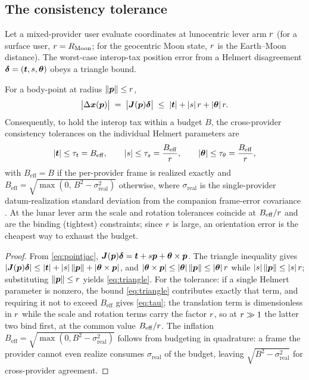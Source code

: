 \subsection{The consistency tolerance}

Let a mixed-provider user evaluate coordinates at lunocentric lever arm $r$
(for a surface user, $r=R_{\mathrm{Moon}}$; for the geocentric Moon state,
$r$ is the Earth--Moon distance). The worst-case interop-tax position error from
a Helmert disagreement $\bm{\delta}=(\bm{t},s,\bm{\theta})$ obeys a triangle bound.

\begin{theorem}
\label{thm:tolerance}
For a body-point at radius $\|\bm{p}\|\le r$,
\begin{equation}
  \bigl|\Delta\bm{x}(\bm{p})\bigr|
  \;=\; \bigl|\bm{J}(\bm{p})\bm{\delta}\bigr|
  \;\le\; |\bm{t}| + |s|\,r + |\bm{\theta}|\,r .
  \label{eq:triangle}
\end{equation}
Consequently, to hold the interop tax within a budget $B$, the cross-provider
consistency tolerances on the individual Helmert parameters are
\begin{equation}
  |\bm{t}| \le \tau_t = B_{\mathrm{eff}},
  \qquad
  |s| \le \tau_s = \frac{B_{\mathrm{eff}}}{r},
  \qquad
  |\bm{\theta}| \le \tau_\theta = \frac{B_{\mathrm{eff}}}{r},
  \label{eq:tau}
\end{equation}
with $B_{\mathrm{eff}}=B$ if the per-provider frame is realized exactly and
$B_{\mathrm{eff}}=\sqrt{\max(0,\,B^2-\sigma_{\mathrm{real}}^2)}$ otherwise, where
$\sigma_{\mathrm{real}}$ is the single-provider datum-realization standard deviation
from the companion frame-error covariance \citep{baweja2026datum}. At the lunar lever
arm the scale and rotation tolerances coincide at $B_{\mathrm{eff}}/r$ and are
the binding (tightest) constraints; since $r$ is large, an orientation error is
the cheapest way to exhaust the budget.
\end{theorem}

\begin{proof}
From \eqref{eq:pointjac},
$\bm{J}(\bm{p})\bm{\delta}=\bm{t}+s\bm{p}+\bm{\theta}\times\bm{p}$. The triangle inequality gives
$|\bm{J}(\bm{p})\bm{\delta}|\le|\bm{t}|+|s|\,\|\bm{p}\|+|\bm{\theta}\times\bm{p}|$, and
$|\bm{\theta}\times\bm{p}|\le|\bm{\theta}|\,\|\bm{p}\|\le|\bm{\theta}|\,r$ while
$|s|\,\|\bm{p}\|\le|s|\,r$; substituting $\|\bm{p}\|\le r$ yields
\eqref{eq:triangle}. For the tolerance: if a single Helmert parameter is nonzero, the
bound \eqref{eq:triangle} contributes exactly that term, and requiring it not to
exceed $B_{\mathrm{eff}}$ gives \eqref{eq:tau}; the translation term is dimensionless
in $r$ while the scale and rotation terms carry the factor $r$, so at
$r\gg1$ the latter two bind first, at the common value $B_{\mathrm{eff}}/r$.
The inflation $B_{\mathrm{eff}}=\sqrt{\max(0,B^2-\sigma_{\mathrm{real}}^2)}$ follows
from budgeting in quadrature: a frame the provider cannot even realize consumes
$\sigma_{\mathrm{real}}$ of the budget, leaving
$\sqrt{B^2-\sigma_{\mathrm{real}}^2}$ for cross-provider agreement.
\end{proof}

